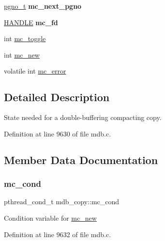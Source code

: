 \begin{DoxyCompactItemize}
\mbox{\hyperlink{group__internal_gadb65f0424c9d3827bf6409087ad555cd}{pgno\+\_\+t}} {\bfseries mc\+\_\+next\+\_\+pgno}
\item 
\mbox{\label{structmdb__copy_a2aff548a1f92440c3bbe5aba9b37e4b4}} 
\mbox{\hyperlink{group__compat_gab521aa5010fb1afb801a899a55569e03}{H\+A\+N\+D\+LE}} {\bfseries mc\+\_\+fd}
\item 
int \mbox{\hyperlink{structmdb__copy_a1c11af71f83f104842d8d185f63bdf3b}{mc\+\_\+toggle}}
\item 
int \mbox{\hyperlink{structmdb__copy_ad0b5ae51d58c4d5e227931c00e955b86}{mc\+\_\+new}}
\item 
volatile int \mbox{\hyperlink{structmdb__copy_a1e93acde2473500804ddc2d71b39997f}{mc\+\_\+error}}
\end{DoxyCompactItemize}


\subsection{Detailed Description}
State needed for a double-\/buffering compacting copy. 

Definition at line 9630 of file mdb.\+c.



\subsection{Member Data Documentation}
\mbox{\label{structmdb__copy_ac5841d54d99b78b4dde87d043a232224}} 
\subsubsection{\texorpdfstring{mc\+\_\+cond}{mc\_cond}}
{\footnotesize\ttfamily pthread\+\_\+cond\+\_\+t mdb\+\_\+copy\+::mc\+\_\+cond}

Condition variable for \mbox{\hyperlink{structmdb__copy_ad0b5ae51d58c4d5e227931c00e955b86}{mc\+\_\+new}} 

Definition at line 9632 of file mdb.\+c.

\mbox{\label{structmdb__copy_a1e93acde2473500804ddc2d71b39997f}} 
